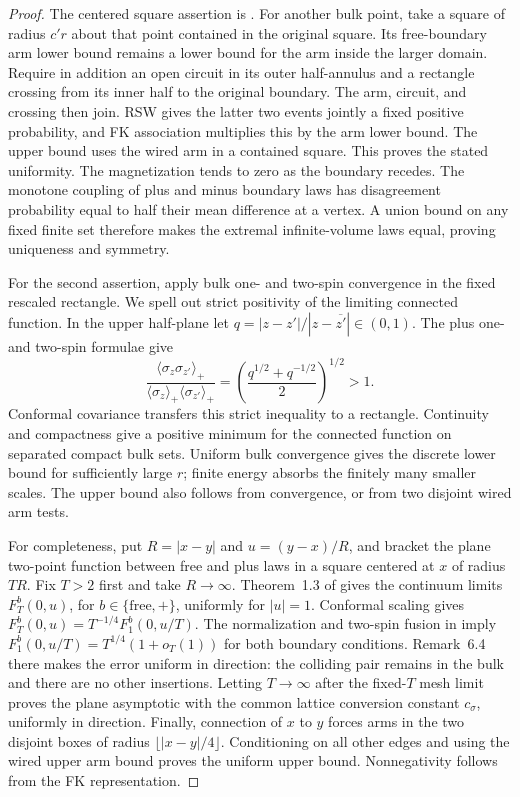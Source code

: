 \documentclass[11pt]{article}
\theoremstyle{definition}
\theoremstyle{remark}
\numberwithin{equation}{section}
\begin{document}
\begin{proof}
The centered square assertion is
\cite[arXiv version~1, Lemma~26]{DHN2011}.
For another bulk point, take a square of radius \(c'r\) about that
point contained in the original square.  Its free-boundary arm lower
bound remains a lower bound for the arm inside the larger domain.
Require in addition an open circuit in its outer half-annulus and
a rectangle crossing from its inner half to the original boundary.
The arm, circuit, and crossing then join.  RSW gives the latter two
events jointly a fixed positive probability, and FK association
multiplies this by the arm lower bound.  The upper bound uses the
wired arm in a contained square.  This proves the stated uniformity.
The magnetization tends to zero as the boundary recedes.  The monotone
coupling of plus and minus boundary laws has disagreement probability
equal to half their mean difference at a vertex.  A union bound on any
fixed finite set therefore makes the extremal infinite-volume laws equal,
proving uniqueness and symmetry.

For the second assertion, apply bulk one- and two-spin convergence
\cite[Theorem~1.3]{CHI2021} in the fixed rescaled rectangle.  We spell out
strict positivity of the limiting connected function.  In the upper
half-plane let
\(q=|z-z'|/|z-\overline{z'}|\in(0,1)\).
The plus one- and two-spin formulae
\cite[Theorem~7.1, Equation~(7.3)]{CHI2021} give
\[
 \frac{\langle\sigma_z\sigma_{z'}\rangle_+}
      {\langle\sigma_z\rangle_+\langle\sigma_{z'}\rangle_+}
 =\left(\frac{q^{1/2}+q^{-1/2}}2\right)^{1/2}>1.
\]
Conformal covariance transfers this strict inequality to a rectangle.
Continuity and compactness give a positive minimum for the connected
function on separated compact bulk sets.  Uniform bulk convergence gives
the discrete lower bound for sufficiently large \(r\); finite energy
absorbs the finitely many smaller scales.  The upper bound also follows
from convergence, or from two disjoint wired arm tests.

For completeness, put \(R=|x-y|\) and \(u=(y-x)/R\), and bracket the
plane two-point function between free and plus laws in a square centered
at \(x\) of radius \(TR\).  Fix \(T>2\) first and take \(R\to\infty\).
Theorem~1.3 of \cite{CHI2021} gives the continuum limits
\(F_T^b(0,u)\), for \(b\in\{\mathrm{free},+\}\), uniformly for
\(|u|=1\).  Conformal scaling gives
\(F_T^b(0,u)=T^{-1/4}F_1^b(0,u/T)\).
The normalization and two-spin fusion in
\cite[Proposition~5.3, Theorem~6.3, Equation~(6.12)]{CHI2021} imply
\(F_1^b(0,u/T)=T^{1/4}(1+o_T(1))\) for both boundary conditions.
Remark~6.4 there makes the error uniform in direction: the colliding
pair remains in the bulk and there are no other insertions.  Letting
\(T\to\infty\) after the fixed-\(T\) mesh limit proves the plane
asymptotic with the common lattice conversion constant \(c_\sigma\),
uniformly in direction.  Finally, connection of \(x\) to \(y\) forces arms in the two
disjoint boxes of radius \(\lfloor|x-y|/4\rfloor\).  Conditioning on all
other edges and using the wired upper arm bound proves the uniform upper
bound.  Nonnegativity follows from the FK representation.
\end{proof}
\end{document}
